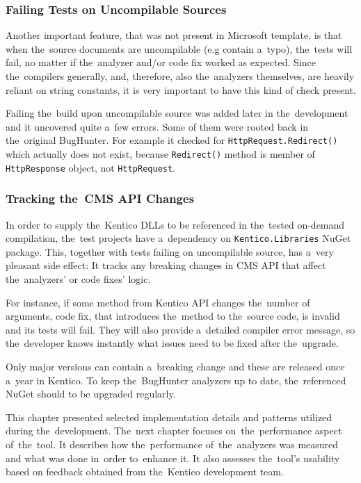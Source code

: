 \documentclass[
  digital, %
  table,   %
  lof,     %
  lot,     %
  oneside,
]{fithesis3}
\begin{document}
\subsubsection{Failing Tests on Uncompilable Sources}
Another important feature, that was not present in Microsoft template, is that when the~source documents are uncompilable (e.g contain a~typo), the~tests will fail, no matter if the~analyzer and/or code fix worked as expected. Since the~compilers generally, and, therefore, also the~analyzers themselves, are heavily reliant on string constants, it is very important to have this kind of check present.

Failing the~build upon uncompilable source was added later in the~development and it uncovered quite a~few errors. Some of them were rooted back in the~original BugHunter. For example it checked for \texttt{HttpRequest.Redirect()} which actually does not exist, because \texttt{Redirect()} method is member of \texttt{HttpResponse} object, not \texttt{HttpRequest}.

\subsubsection{Tracking the~CMS API Changes}
In order to supply the~Kentico DLLs to be referenced in the~tested on-demand compilation, the~test projects have a~dependency on \texttt{Kentico.Libraries} NuGet package. This, together with tests failing on uncompilable source, has a~very pleasant side effect: It tracks any breaking changes in CMS API that affect the~analyzers' or code fixes' logic.

For instance, if some method from Kentico API changes the~number of arguments, code fix, that introduces the~method to the~source code, is invalid and its tests will fail. They will also provide a~detailed compiler error message, so the~developer knows instantly what issues need to be fixed after the~upgrade.

Only major versions can contain a~breaking change and these are released once a~year in Kentico. To keep the~BugHunter analyzers up to date, the~referenced NuGet should to be upgraded regularly.

\bigskip\noindent
This chapter presented selected implementation details and patterns utilized during the~development. The~next chapter focuses on~the~performance aspect of~the~tool. It describes how the~performance of~the~analyzers was measured and what was done in~order to~enhance it. It also assesses the~tool's usability based on feedback obtained from the~Kentico development team.
\end{document}
